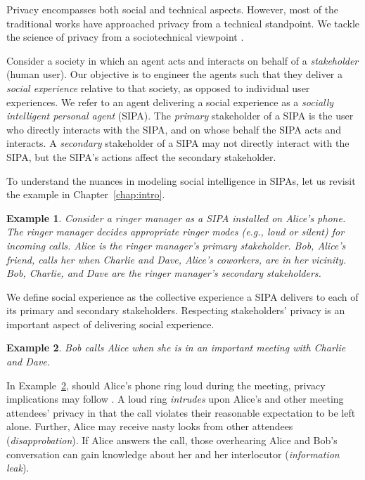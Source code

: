 \documentclass[11pt,          %
               phd,           %
               onehalfspacing %
               ]{ncsuthesis}
\newtheorem{example}{Example}
\begin{document}
Privacy encompasses both social and technical aspects. However, most of
the traditional works have approached privacy from a technical
standpoint. We tackle the science of privacy from a sociotechnical
viewpoint \citep{Kafali-IS16-Revani,WWW-16:IOSE}.

Consider a society in which an agent acts and interacts on behalf of a
\emph{stakeholder} (human user). Our objective is to engineer the agents
such that they deliver a \emph{social experience} relative to that
society, as opposed to individual user experiences. We refer to an agent
delivering a social experience as a \emph{socially intelligent personal
agent} (SIPA). The \emph{primary} stakeholder of a SIPA is the user who
directly interacts with the SIPA, and on whose behalf the SIPA acts and
interacts. A \emph{secondary} stakeholder of a SIPA may not directly
interact with the SIPA, but the SIPA's actions affect the secondary
stakeholder.

To understand the nuances in modeling social intelligence in SIPAs, 
let us revisit the example in Chapter~\ref{chap:intro}. 

\begin{example} \label{ex:ringer-meeting} Consider a ringer manager as a
SIPA installed on Alice's phone. The ringer manager decides appropriate
ringer modes (e.g., loud or silent) for incoming calls. Alice is the
ringer manager's primary stakeholder. Bob, Alice's friend, calls her
when Charlie and Dave, Alice's coworkers, are in her vicinity. Bob,
Charlie, and Dave are the ringer manager's secondary stakeholders.
\end{example}


We define social experience as the collective experience a SIPA delivers
to each of its primary and secondary stakeholders. Respecting
stakeholders' privacy is an important aspect of delivering social
experience.

\begin{example} \label{ex:ringer-implications} Bob calls Alice when she
is in an important meeting with Charlie and Dave. \end{example}

In Example~\ref{ex:ringer-implications}, should Alice's phone ring loud
during the meeting, privacy implications may follow
\citep{solove-2006-taxonomy,Murukannaiah-IC16-Engineering}. A loud ring
\emph{intrudes} upon Alice's and other meeting attendees' privacy in
that the call violates their reasonable expectation to be left alone.
Further, Alice may receive nasty looks from other attendees
(\emph{disapprobation}). If Alice answers the call, those overhearing
Alice and Bob's conversation can gain knowledge about her and her
interlocutor (\emph{information leak}).
\end{document}
